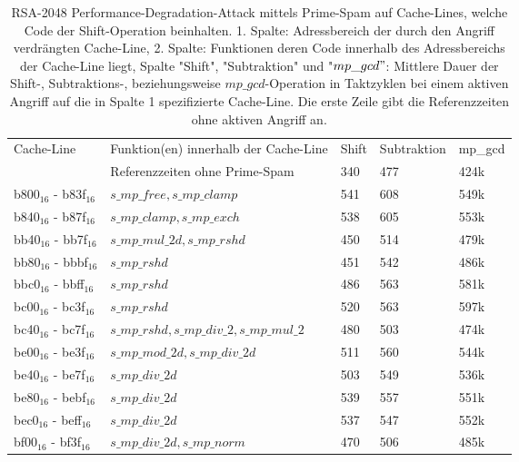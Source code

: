 \begin{table}[h]
\label{tbl:PerformanceDegShift}
\caption{RSA-2048 Performance-Degradation-Attack mittels Prime-Spam auf Cache-Lines, welche Code der Shift-Operation beinhalten. 1. Spalte: Adressbereich der durch den Angriff verdrängten Cache-Line, 2. Spalte: Funktionen deren Code innerhalb des Adressbereichs der Cache-Line liegt, Spalte "Shift", "Subtraktion" und "$mp\_gcd"$: Mittlere Dauer der Shift-, Subtraktions-, beziehungsweise $mp\_gcd$-Operation in Taktzyklen bei einem aktiven Angriff auf die in Spalte 1 spezifizierte Cache-Line. Die erste Zeile gibt die Referenzzeiten ohne aktiven Angriff an. }
\begin{tabular}{lllll}
Cache-Line  & Funktion(en) innerhalb der Cache-Line                                  & Shift & Subtraktion & mp\_gcd \\[10pt]
&Referenzzeiten ohne Prime-Spam                                         & 340   & 477         & 424k    \\
b800$_{16}$ - b83f$_{16}$ & $s\_mp\_free, s\_mp\_clamp$                 & 541   & 608         & 549k    \\
b840$_{16}$ - b87f$_{16}$ & $s\_mp\_clamp, s\_mp\_exch$                 & 538   & 605         & 553k    \\
bb40$_{16}$ - bb7f$_{16}$ & $s\_mp\_mul\_2d, s\_mp\_rshd$               & 450   & 514         & 479k    \\
bb80$_{16}$ - bbbf$_{16}$ & $s\_mp\_rshd$                               & 451   & 542         & 486k    \\
bbc0$_{16}$ - bbff$_{16}$ & $s\_mp\_rshd$                               & 486   & 563         & 581k    \\
bc00$_{16}$ - bc3f$_{16}$ & $s\_mp\_rshd$                               & 520   & 563         & 597k    \\
bc40$_{16}$ - bc7f$_{16}$ & $s\_mp\_rshd, s\_mp\_div\_2, s\_mp\_mul\_2$ & 480   & 503         & 474k    \\
be00$_{16}$ - be3f$_{16}$ & $s\_mp\_mod\_2d, s\_mp\_div\_2d$            & 511   & 560         & 544k    \\
be40$_{16}$ - be7f$_{16}$ & $s\_mp\_div\_2d$                            & 503   & 549         & 536k    \\
be80$_{16}$ - bebf$_{16}$ & $s\_mp\_div\_2d$                            & 539   & 557         & 551k    \\
bec0$_{16}$ - beff$_{16}$ & $s\_mp\_div\_2d$                            & 537   & 547         & 552k    \\
bf00$_{16}$ - bf3f$_{16}$ & $s\_mp\_div\_2d, s\_mp\_norm$               & 470   & 506         & 485k   
\end{tabular}
\end{table}

